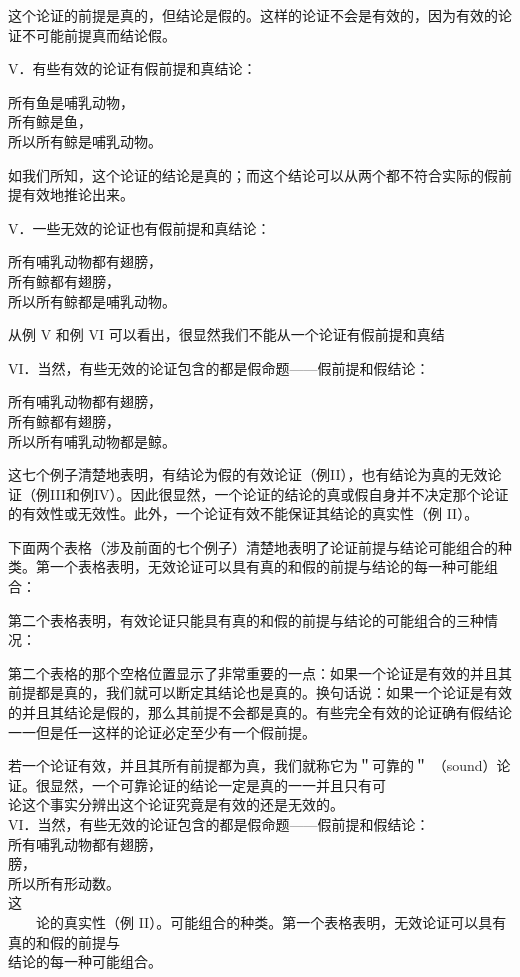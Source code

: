 这个论证的前提是真的，但结论是假的。这样的论证不会是有效的，因为有效的论证不可能前提真而结论假。

V．有些有效的论证有假前提和真结论：

所有鱼是哺乳动物，\\
所有鲸是鱼，\\
所以所有鲸是哺乳动物。

如我们所知，这个论证的结论是真的；而这个结论可以从两个都不符合实际的假前提有效地推论出来。

V．一些无效的论证也有假前提和真结论：

所有哺乳动物都有翅膀，\\
所有鲸都有翅膀，\\
所以所有鲸都是哺乳动物。

从例 V 和例 VI 可以看出，很显然我们不能从一个论证有假前提和真结

VI．当然，有些无效的论证包含的都是假命题——假前提和假结论：

所有哺乳动物都有翅膀，\\
所有鲸都有翅膀，\\
所以所有哺乳动物都是鲸。

这七个例子清楚地表明，有结论为假的有效论证（例II），也有结论为真的无效论证（例III和例IV）。因此很显然，一个论证的结论的真或假自身并不决定那个论证的有效性或无效性。此外，一个论证有效不能保证其结论的真实性（例 II）。

下面两个表格（涉及前面的七个例子）清楚地表明了论证前提与结论可能组合的种类。第一个表格表明，无效论证可以具有真的和假的前提与结论的每一种可能组合：

第二个表格表明，有效论证只能具有真的和假的前提与结论的可能组合的三种情况：

第二个表格的那个空格位置显示了非常重要的一点：如果一个论证是有效的并且其前提都是真的，我们就可以断定其结论也是真的。换句话说：如果一个论证是有效的并且其结论是假的，那么其前提不会都是真的。有些完全有效的论证确有假结论一一但是任一这样的论证必定至少有一个假前提。

若一个论证有效，并且其所有前提都为真，我们就称它为＂可靠的＂ （sound）论证。很显然，一个可靠论证的结论一定是真的一一并且只有可\\
论这个事实分辨出这个论证究竟是有效的还是无效的。\\
VI．当然，有些无效的论证包含的都是假命题——假前提和假结论：\\
所有哺乳动物都有翅膀，\\
膀，\\
所以所有形动数。\\
这\\
$\qquad$论的真实性（例 II）。可能组合的种类。第一个表格表明，无效论证可以具有真的和假的前提与\\
结论的每一种可能组合。

